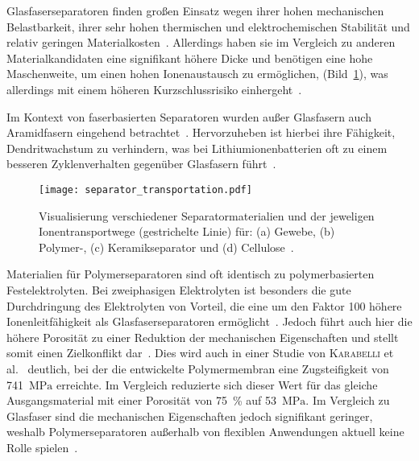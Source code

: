 

Glasfaserseparatoren finden großen Einsatz wegen ihrer hohen mechanischen Belastbarkeit, ihrer sehr hohen thermischen und elektrochemischen Stabilität und relativ geringen Materialkosten~\cite{Luo2015,Asp2019,Asp2021,Liu2022}. Allerdings haben sie im Vergleich zu anderen Materialkandidaten eine signifikant höhere Dicke und benötigen eine hohe Maschenweite, um einen hohen Ionenaustausch zu ermöglichen, (Bild~\ref{fig:separator_transportation}), was allerdings mit einem höheren Kurzschlussrisiko einhergeht~\cite{Danzi2021,Zhou2022}. 

Im Kontext von faserbasierten Separatoren wurden außer Glasfasern auch Aramidfasern eingehend betrachtet~\cite{Jin2023}. Hervorzuheben ist hierbei ihre Fähigkeit, Dendritwachstum zu verhindern, was bei Lithiumionenbatterien oft zu einem besseren Zyklenverhalten gegenüber Glasfasern führt~\cite{Tung2015,Wang2021a}.

\begin{figure}[ht]
        \center
	\texttt{[image: separator\_transportation.pdf]}
		\caption{\label{fig:separator_transportation}Visualisierung verschiedener Separatormaterialien und der jeweligen Ionentransportwege (gestrichelte Linie) für: (a) Gewebe, (b) Polymer-, (c) Keramikseparator und (d) Cellulose~\cite{Zschiebsch2024}.}
\end{figure}


Materialien für Polymerseparatoren sind oft identisch zu polymerbasierten Festelektrolyten. Bei zweiphasigen Elektrolyten ist besonders die gute Durchdringung des Elektrolyten von Vorteil, die eine um den Faktor 100 höhere Ionenleitfähigkeit als Glasfaserseparatoren ermöglicht~\cite{Wang2021a}. Jedoch führt auch hier die höhere Porosität zu einer Reduktion der mechanischen Eigenschaften und stellt somit einen Zielkonflikt dar~\cite{Ahankari2022}. Dies wird auch in einer Studie von \textsc{Karabelli} et al.~\cite{Karabelli2011} deutlich, bei der die entwickelte Polymermembran eine Zugsteifigkeit von 741~$\si{\MPa}$ erreichte. Im Vergleich reduzierte sich dieser Wert für das gleiche Ausgangsmaterial mit einer Porosität von 75~\% auf 53~$\si{\MPa}$. Im Vergleich zu Glasfaser sind die mechanischen Eigenschaften jedoch signifikant geringer, weshalb Polymerseparatoren außerhalb von flexiblen Anwendungen aktuell keine Rolle spielen~\cite{Zschiebsch2024}.

